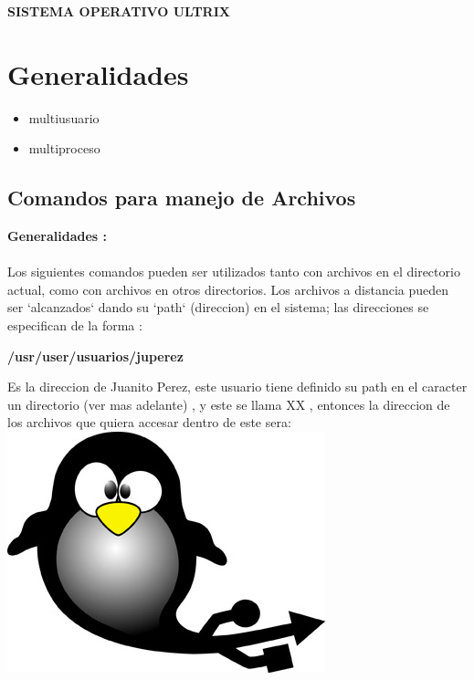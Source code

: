 \documentclass[12pt,spanich]{article}
\begin{document}
 


\begin{center}
{\bf SISTEMA OPERATIVO ULTRIX\\ }                                  
\end{center}

\section{Generalidades}

\begin{itemize} 
                       \item multiusuario
                       \item multiproceso
\end{itemize}

\subsection{Comandos para manejo de Archivos}

  {\bf Generalidades :}\\  \\ 
Los  siguientes  comandos pueden ser utilizados  tanto
con archivos en el directorio actual, como con
archivos en otros directorios. Los archivos a distancia pueden ser `alcanzados` dando su
`path` (direccion) en el sistema; las direcciones se especifican
de la forma :\\                                                        
\begin{center}
 {\bf /usr/user/usuarios/juperez}\\ 
\end{center}
Es la direccion  de  Juanito  Perez,
este usuario tiene definido su path en el caracter %
un directorio (ver mas adelante) , y este se  llama XX ,  entonces  la
direccion de los archivos que quiera accesar dentro de este sera:\\ 

\includegraphics{./logo_pinguino.jpg}
\end{document}
